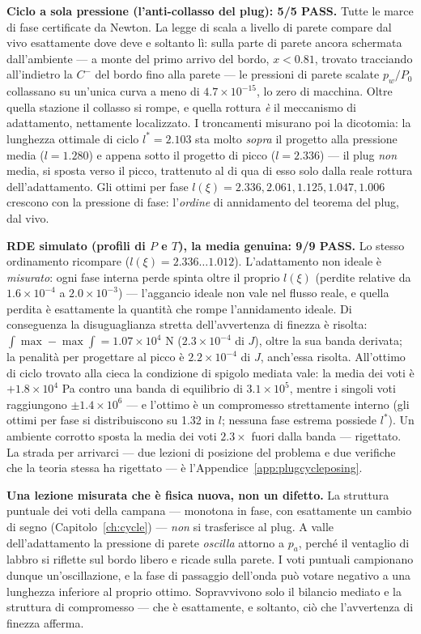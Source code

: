 \textbf{Ciclo a sola pressione (l'anti-collasso del plug): 5/5
PASS.} Tutte le marce di fase certificate da Newton. La legge di
scala a livello di parete compare dal vivo esattamente dove deve e
soltanto lì: sulla parte di parete ancora schermata dall'ambiente ---
a monte del primo arrivo del bordo, $x < 0.81$, trovato tracciando
all'indietro la $C^{-}$ del bordo fino alla parete --- le pressioni
di parete scalate $p_w/P_0$ collassano su un'unica curva a meno di
$4.7\times10^{-15}$, lo zero di macchina. Oltre quella stazione il
collasso si rompe, e quella rottura \emph{è} il meccanismo di
adattamento, nettamente localizzato. I troncamenti misurano poi la
dicotomia: la lunghezza ottimale di ciclo $l^{*} = 2.103$ sta molto
\emph{sopra} il progetto alla pressione media ($l = 1.280$) e appena
sotto il progetto di picco ($l = 2.336$) --- il plug \emph{non}
media, si sposta verso il picco, trattenuto al di qua di esso solo
dalla reale rottura dell'adattamento. Gli ottimi per fase
$l(\xi) = 2.336, 2.061, 1.125, 1.047, 1.006$ crescono con la
pressione di fase: l'\emph{ordine} di annidamento del teorema del
plug, dal vivo.

\textbf{RDE simulato (profili di $P$ e $T$), la media genuina: 9/9
PASS.} Lo stesso ordinamento ricompare
($l(\xi) = 2.336 \ldots 1.012$). L'adattamento non ideale è
\emph{misurato}: ogni fase interna perde spinta oltre il proprio
$l(\xi)$ (perdite relative da $1.6\times10^{-4}$ a
$2.0\times10^{-3}$) --- l'aggancio ideale non vale nel flusso reale,
e quella perdita è esattamente la quantità che rompe l'annidamento
ideale. Di conseguenza la disuguaglianza stretta dell'avvertenza di
finezza è risolta:
$\int\max - \max\int = 1.07\times10^{4}$ N ($2.3\times10^{-4}$ di
$J$), oltre la sua banda derivata; la penalità per progettare al
picco è $2.2\times10^{-4}$ di $J$, anch'essa risolta. All'ottimo di
ciclo trovato alla cieca la condizione di spigolo mediata vale: la
media dei voti è $+1.8\times10^{4}$ Pa contro una banda di
equilibrio di $3.1\times10^{5}$, mentre i singoli voti raggiungono
$\pm1.4\times10^{6}$ --- e l'ottimo è un compromesso strettamente
interno (gli ottimi per fase si distribuiscono su 1.32 in $l$;
nessuna fase estrema possiede $l^{*}$). Un ambiente corrotto sposta
la media dei voti $2.3\times$ fuori dalla banda --- rigettato. La
strada per arrivarci --- due lezioni di posizione del problema e due
verifiche che la teoria stessa ha rigettato --- è
l'Appendice~\ref{app:plugcycleposing}.

\textbf{Una lezione misurata che è fisica nuova, non un difetto.} La
struttura puntuale dei voti della campana --- monotona in fase, con
esattamente un cambio di segno (Capitolo~\ref{ch:cycle}) --- \emph{non}
si trasferisce al plug. A valle dell'adattamento la pressione di
parete \emph{oscilla} attorno a $p_a$, perché il ventaglio di labbro
si riflette sul bordo libero e ricade sulla parete. I voti puntuali
campionano dunque un'oscillazione, e la fase di passaggio dell'onda
può votare negativo a una lunghezza inferiore al proprio ottimo.
Sopravvivono solo il bilancio mediato e la struttura di compromesso
--- che è esattamente, e soltanto, ciò che l'avvertenza di finezza
afferma.

